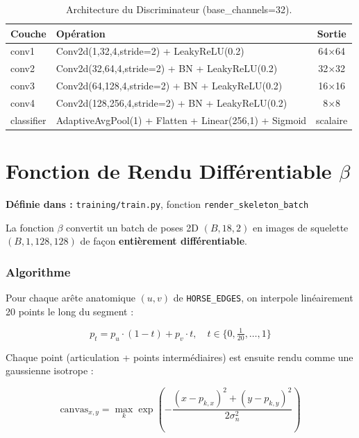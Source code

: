 \documentclass[12pt,a4paper]{article}
\begin{document}
\begin{table}[H]
  \centering
  \caption{Architecture du Discriminateur (base\_channels=32).}
  \begin{tabular}{llc}
  \toprule
  \textbf{Couche} & \textbf{Opération} & \textbf{Sortie} \\
  \midrule
  conv1 & Conv2d(1,32,4,stride=2) + LeakyReLU(0.2) & 64×64 \\
  conv2 & Conv2d(32,64,4,stride=2) + BN + LeakyReLU(0.2) & 32×32 \\
  conv3 & Conv2d(64,128,4,stride=2) + BN + LeakyReLU(0.2) & 16×16 \\
  conv4 & Conv2d(128,256,4,stride=2) + BN + LeakyReLU(0.2) & 8×8 \\
  classifier & AdaptiveAvgPool(1) + Flatten + Linear(256,1) + Sigmoid & scalaire \\
  \bottomrule
  \end{tabular}
\end{table}

\section{Fonction de Rendu Différentiable $\beta$}

\textbf{Définie dans :} \texttt{training/train.py}, fonction \texttt{render\_skeleton\_batch}

La fonction $\beta$ convertit un batch de poses 2D $(B, 18, 2)$ en images de
squelette $(B, 1, 128, 128)$ de façon \textbf{entièrement différentiable}.

\subsubsection*{Algorithme}

Pour chaque arête anatomique $(u, v)$ de \texttt{HORSE\_EDGES}, on interpole
linéairement 20 points le long du segment :

\begin{equation}
  p_t = p_u \cdot (1 - t) + p_v \cdot t, \quad t \in \{0, \tfrac{1}{20}, \ldots, 1\}
\end{equation}

Chaque point (articulation + points intermédiaires) est ensuite rendu comme une
gaussienne isotrope :

\begin{equation}
  \text{canvas}_{x,y} = \max_k \exp\!\left(-\frac{(x - p_{k,x})^2 + (y - p_{k,y})^2}{2\sigma_n^2}\right)
\end{equation}
\end{document}
